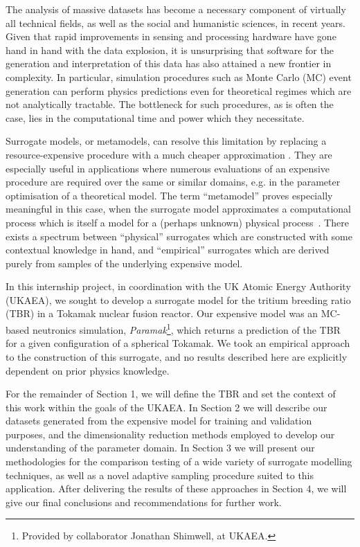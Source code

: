 The analysis of massive datasets has become a necessary component of virtually all technical fields, as well as the social and humanistic sciences, in recent years. Given that rapid improvements in sensing and processing hardware have gone hand in hand with the data explosion, it is unsurprising that software for the generation and interpretation of this data has also attained a new frontier in complexity. In particular, simulation procedures such as Monte Carlo (MC) event generation can perform physics predictions even for theoretical regimes which are not analytically tractable. The bottleneck for such procedures, as is often the case, lies in the computational time and power which they necessitate.

Surrogate models, or metamodels, can resolve this limitation by replacing a
resource-expensive procedure with a much cheaper approximation
\cite{Sondergaard2003}. They are especially useful in applications where
numerous evaluations of an expensive procedure are required over the same or
similar domains, e.g. in the parameter optimisation of a theoretical model. The
term ``metamodel'' proves especially meaningful in this case, when the surrogate
model approximates a computational process which is itself a model for a
(perhaps unknown) physical process~\cite{Myers2002}. There exists a spectrum
between ``physical'' surrogates which are constructed with some contextual
knowledge in hand, and ``empirical'' surrogates which are derived purely from
samples of the underlying expensive model.

In this internship project, in coordination with the UK Atomic Energy Authority (UKAEA), we sought to develop a surrogate model for the tritium breeding ratio (TBR) in a Tokamak nuclear fusion reactor. Our expensive model was an MC-based neutronics simulation, \textit{Paramak}\footnote{Provided by collaborator Jonathan Shimwell, at UKAEA.}, which returns a prediction of the TBR for a given configuration of a spherical Tokamak. We took an empirical approach to the construction of this surrogate, and no results described here are explicitly dependent on prior physics knowledge.

For the remainder of Section 1, we will define the TBR and set the context of this work within the goals of the UKAEA. In Section 2 we will describe our datasets generated from the expensive model for training and validation purposes, and the dimensionality reduction methods employed to develop our understanding of the parameter domain. In Section 3 we will present our methodologies for the comparison testing of a wide variety of surrogate modelling techniques, as well as a novel adaptive sampling procedure suited to this application. After delivering the results of these approaches in Section 4, we will give our final conclusions and recommendations for further work.

